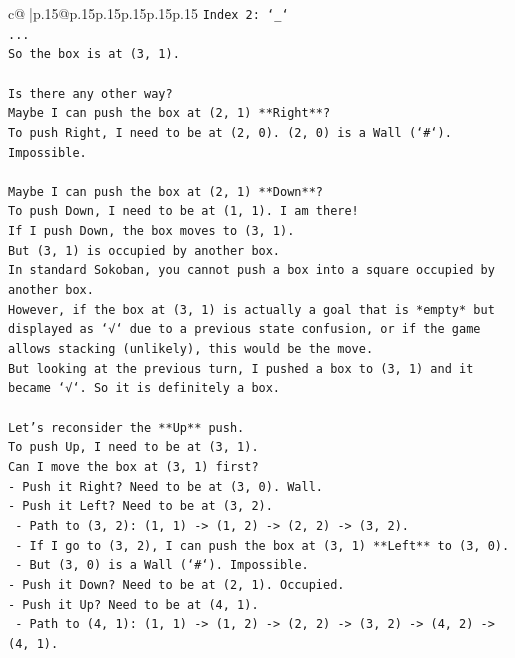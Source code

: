 \documentclass{article}
\begin{document}
{\begin{supertabular}{c@{$\;$}|p{.15\linewidth}@{}p{.15\linewidth}p{.15\linewidth}p{.15\linewidth}p{.15\linewidth}p{.15\linewidth}}
{{{\texttt{Index 2: `\_`} \\
\texttt{...} \\
\texttt{So the box is at (3, 1).} \\
\\ 
\texttt{Is there any other way?} \\
\texttt{Maybe I can push the box at (2, 1) **Right**?} \\
\texttt{To push Right, I need to be at (2, 0). (2, 0) is a Wall (`\#`). Impossible.} \\
\\ 
\texttt{Maybe I can push the box at (2, 1) **Down**?} \\
\texttt{To push Down, I need to be at (1, 1). I am there!} \\
\texttt{If I push Down, the box moves to (3, 1).} \\
\texttt{But (3, 1) is occupied by another box.} \\
\texttt{In standard Sokoban, you cannot push a box into a square occupied by another box.} \\
\texttt{However, if the box at (3, 1) is actually a goal that is *empty* but displayed as `√` due to a previous state confusion, or if the game allows stacking (unlikely), this would be the move.} \\
\texttt{But looking at the previous turn, I pushed a box to (3, 1) and it became `√`. So it is definitely a box.} \\
\\ 
\texttt{Let's reconsider the **Up** push.} \\
\texttt{To push Up, I need to be at (3, 1).} \\
\texttt{Can I move the box at (3, 1) first?} \\
\texttt{{-} Push it Right? Need to be at (3, 0). Wall.} \\
\texttt{{-} Push it Left? Need to be at (3, 2).} \\
\texttt{  {-} Path to (3, 2): (1, 1) {-}> (1, 2) {-}> (2, 2) {-}> (3, 2).} \\
\texttt{  {-} If I go to (3, 2), I can push the box at (3, 1) **Left** to (3, 0).} \\
\texttt{  {-} But (3, 0) is a Wall (`\#`). Impossible.} \\
\texttt{{-} Push it Down? Need to be at (2, 1). Occupied.} \\
\texttt{{-} Push it Up? Need to be at (4, 1).} \\
\texttt{  {-} Path to (4, 1): (1, 1) {-}> (1, 2) {-}> (2, 2) {-}> (3, 2) {-}> (4, 2) {-}> (4, 1).} \\
}}}
\end{supertabular}}
\end{document}
